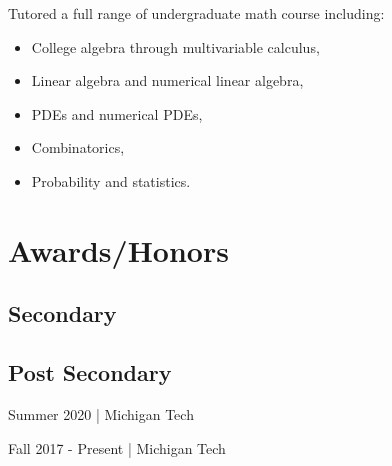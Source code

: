 \documentclass[letterpaper]{deedy-resume} %
\begin{document}
\begin{minipage}[t]{0.63\textwidth}
\sectionspace


Tutored a full range of undergraduate math course including:
\begin{itemize}[itemsep = 0pt, parsep = 0pt, topsep = 0pt]
    \item College algebra through multivariable calculus,
    \item Linear algebra and numerical linear algebra,
    \item PDEs and numerical PDEs, 
    \item Combinatorics,
    \item Probability and statistics.
\end{itemize}


\section{Awards/Honors} 
\subsection{Secondary}

\sectionspace

\subsection{Post Secondary}

\sectionspace

Summer 2020 | Michigan Tech

\sectionspace

Fall 2017 - Present | Michigan Tech


\sectionspace


\sectionspace %



\end{minipage} %
\end{document}
